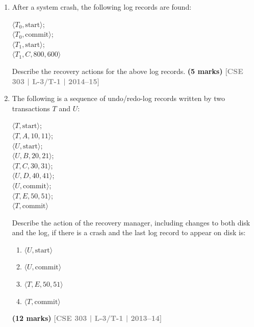 \documentclass[12pt]{article}
\newcommand{\yr}[1]{\hfill\textcolor{gray}{\small\textbf{[#1]}}}
\newcommand{\mk}[1]{\textcolor{orange!70!black}{\small\textbf{(#1 marks)}}}
\begin{document}
\begin{enumerate}
\begin{enumerate}
  \item Write log records for the above transactions.
  \item Show the log-based recovery if a failure occurs after WRITE($A_3$).
  \item Show the recovery if a failure occurs after WRITE($A_2$).
\end{enumerate}
\mk{15} \yr{CSE 303 | L-3/T-1 | 2015--16}


\item After a system crash, the following log records are found:
\begin{center}
\small\ttfamily
$\langle T_0,\text{start}\rangle$; \\
$\langle T_0,\text{commit}\rangle$; \\
$\langle T_1,\text{start}\rangle$; \\
$\langle T_1,C,800,600\rangle$
\end{center}
Describe the recovery actions for the above log records.
\mk{5} \yr{CSE 303 | L-3/T-1 | 2014--15}


\item The following is a sequence of undo/redo-log records written by two transactions $T$ and $U$:
\begin{center}
\small\ttfamily
$\langle T,\text{start}\rangle$; \\
$\langle T,A,10,11\rangle$; \\
$\langle U,\text{start}\rangle$; \\
$\langle U,B,20,21\rangle$; \\
$\langle T,C,30,31\rangle$; \\
$\langle U,D,40,41\rangle$; \\
$\langle U,\text{commit}\rangle$; \\
$\langle T,E,50,51\rangle$; \\
$\langle T,\text{commit}\rangle$
\end{center}
Describe the action of the recovery manager, including changes to both disk and the log, if there is a crash and the last log record to appear on disk is:
\begin{enumerate}
  \item $\langle U,\text{start}\rangle$
  \item $\langle U,\text{commit}\rangle$
  \item $\langle T,E,50,51\rangle$
  \item $\langle T,\text{commit}\rangle$
\end{enumerate}
\mk{12} \yr{CSE 303 | L-3/T-1 | 2013--14}



\end{enumerate}
\end{document}
